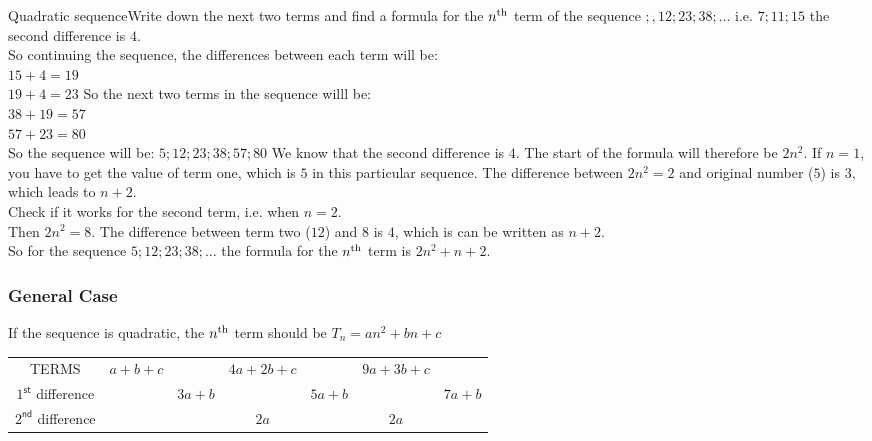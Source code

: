 \begin{wex}{Quadratic sequence}{Write down the next two terms and find a formula for the $n^{\rm th}$ term of the sequence $;, 12; 23; 38;\ldots$}{ 
i.e. $7 ; 11; 15$
the second difference is $4$.\\
So continuing the sequence, the differences between each term will be:\\
$15 + 4 = 19$\\
$19 + 4 = 23$
So the next two terms in the sequence willl be:\\
$38 + 19 = 57$\\
$57 + 23 = 80$\\
So the sequence will be:
$5; 12; 23; 38; 57; 80$
We know that the second difference is $4$. The start of the formula will therefore be $2n^2$.
If $n=1$, you have to get the value of term one, which is $5$ in this particular sequence.  The difference between $2n^2 = 2$ and original number ($5$) is $3$, which leads to $n+2$.\\
Check if it works for the second term, i.e. when $n=2$.\\
Then $2n^2=8$.  The difference between term two ($12$) and $8$ is $4$, which is can be written as $n+2$.\\
So for the sequence $5; 12; 23; 38;\ldots$ the formula for the $n^{\rm th}$ term is $2n^2 + n + 2$.
}
\end{wex}

\subsubsection{General Case}
If the sequence is quadratic, the $n^{\rm th}$ term should be $T_n = an^2 + bn + c$

\begin{center}
\begin{tabular}{ccccccc}
TERMS & $a+b+c$ && $4a+2b+c$ && $9a+3b+c$ & \\
$1^{\textsf{st}}$ difference && $3a+b$ && $5a+b$ && $7a+b$ \\ 
$2^{\textsf{nd}}$ difference &&& $2a$ && $2a$ & \\
\end{tabular}
\end{center}

